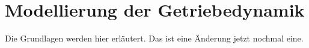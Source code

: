 \chapter{Modellierung der Getriebedynamik}\label{ch:ch2}
Die Grundlagen werden hier erläutert. Das ist eine Änderung jetzt nochmal eine.


